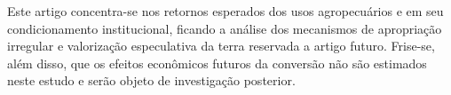 Este artigo concentra-se nos retornos esperados dos usos agropecuários e em seu condicionamento institucional, ficando a análise dos mecanismos de apropriação irregular e valorização especulativa da terra reservada a artigo futuro. Frise-se, além disso, que os efeitos econômicos futuros da conversão não são estimados neste estudo e serão objeto de investigação posterior.
